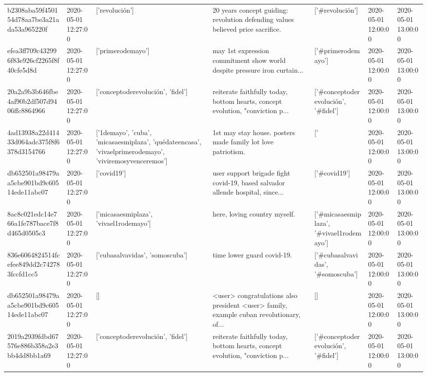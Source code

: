 \begin{tabular}{lllllll}
b2308aba59f450154d78aa7be3a21ada53a965220f & 2020-05-01 12:27:00 & ['revolución'] & 20 years concept guiding: revolution defending values believed price sacrifice. & ['#revolución'] & 2020-05-01 12:00:00 & 2020-05-01 13:00:00 \\
efea3ff709c432996f83e926cf2265f8f40cfe5d8d & 2020-05-01 12:27:00 & ['primerodemayo'] & may 1st expression commitment show world despite pressure iron curtain... & ['#primerodemayo'] & 2020-05-01 12:00:00 & 2020-05-01 13:00:00 \\
20a2a9b3b646fbe4af90b2df507d9406ffc8864966 & 2020-05-01 12:27:00 & ['conceptoderevolución', 'fidel'] & reiterate faithfully today, bottom hearts, concept evolution, "conviction p... & ['#conceptoderevolución', '#fidel'] & 2020-05-01 12:00:00 & 2020-05-01 13:00:00 \\
4ad13938a22d41433d064adc375f8f6378d3154766 & 2020-05-01 12:27:00 & ['1demayo', 'cuba', 'micasaesmiplaza', 'quédateencasa', 'vivaelprimerodemayo', 'viviremosyvenceremos'] & 1st may stay house. posters made family lot love patriotism. & ['#1demayo', '#cuba', '#micasaesmiplaza', '#quédateencasa', '#vivaelprimerodemayo', '#viviremosyvenceremos'] & 2020-05-01 12:00:00 & 2020-05-01 13:00:00 \\
db652501a98479aa5cbe901bd9c60514ede11abc07 & 2020-05-01 12:27:00 & ['covid19'] & user support brigade fight covid-19, based salvador allende hospital, since... & ['#covid19'] & 2020-05-01 12:00:00 & 2020-05-01 13:00:00 \\
8ac8c021edc14e766a1fe787bace7f8d465d0505c3 & 2020-05-01 12:27:00 & ['micasaesmiplaza', 'vivael1rodemayo'] & here, loving country myself. & ['#micasaesmiplaza', '#vivael1rodemayo'] & 2020-05-01 12:00:00 & 2020-05-01 13:00:00 \\
836e6064824514fcefee849dd2c742783fccfd1cc5 & 2020-05-01 12:27:00 & ['cubasalvavidas', 'somoscuba'] & time lower guard covid-19. & ['#cubasalvavidas', '#somoscuba'] & 2020-05-01 12:00:00 & 2020-05-01 13:00:00 \\
db652501a98479aa5cbe901bd9c60514ede11abc07 & 2020-05-01 12:27:00 & [] & <user> congratulations also president <user> family, example cuban revolutionary, of... & [] & 2020-05-01 12:00:00 & 2020-05-01 13:00:00 \\
2019a2939fdbd67576e886b358a2e3bb4dd8bb1a69 & 2020-05-01 12:27:00 & ['conceptoderevolución', 'fidel'] & reiterate faithfully today, bottom hearts, concept evolution, "conviction p... & ['#conceptoderevolución', '#fidel'] & 2020-05-01 12:00:00 & 2020-05-01 13:00:00 \\

\end{tabular}
